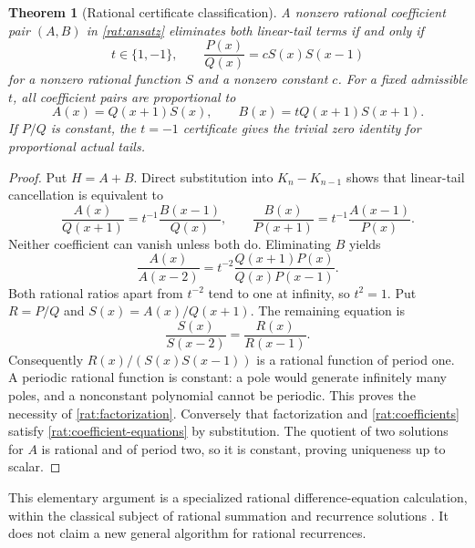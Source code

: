 \documentclass[11pt]{article}
\newtheorem{theorem}{Theorem}[section]
\theoremstyle{definition}
\theoremstyle{remark}
\numberwithin{equation}{section}
\begin{document}
\begin{theorem}[Rational certificate classification]\label{rat:classification}
A nonzero rational coefficient pair $(A,B)$ in \eqref{rat:ansatz}
eliminates both linear-tail terms if and only if
\begin{equation}\label{rat:factorization}
 t\in\{1,-1\},\qquad
 \frac{P(x)}{Q(x)}=cS(x)S(x-1)
\end{equation}
for a nonzero rational function $S$ and a nonzero constant $c$.
For a fixed admissible $t$, all coefficient pairs are proportional to
\begin{equation}\label{rat:coefficients}
 A(x)=Q(x+1)S(x),\qquad B(x)=tQ(x+1)S(x+1).
\end{equation}
If $P/Q$ is constant, the $t=-1$ certificate gives the trivial zero
identity for proportional actual tails.
\end{theorem}

\begin{proof}
Put $H=A+B$. Direct substitution into $K_n-K_{n-1}$ shows that
linear-tail cancellation is equivalent to
\begin{equation}\label{rat:coefficient-equations}
 \frac{A(x)}{Q(x+1)}=t^{-1}\frac{B(x-1)}{Q(x)},\qquad
 \frac{B(x)}{P(x+1)}=t^{-1}\frac{A(x-1)}{P(x)}.
\end{equation}
Neither coefficient can vanish unless both do. Eliminating $B$ yields
\[
 \frac{A(x)}{A(x-2)}=
 t^{-2}\frac{Q(x+1)P(x)}{Q(x)P(x-1)}.
\]
Both rational ratios apart from $t^{-2}$ tend to one at infinity,
so $t^2=1$. Put $R=P/Q$ and $S(x)=A(x)/Q(x+1)$. The remaining
equation is
\[
 \frac{S(x)}{S(x-2)}=\frac{R(x)}{R(x-1)}.
\]
Consequently $R(x)/(S(x)S(x-1))$ is a rational function of period
one. A periodic rational function is constant: a pole would generate
infinitely many poles, and a nonconstant polynomial cannot be
periodic. This proves the necessity of \eqref{rat:factorization}.
Conversely that factorization and \eqref{rat:coefficients} satisfy
\eqref{rat:coefficient-equations} by substitution. The quotient of
two solutions for $A$ is rational and of period two, so it is
constant, proving uniqueness up to scalar.
\end{proof}

This elementary argument is a specialized rational difference-equation
calculation, within the classical subject of rational summation and
recurrence solutions \cite{rat:Abramov}. It does not claim a new general
algorithm for rational recurrences.
\end{document}
